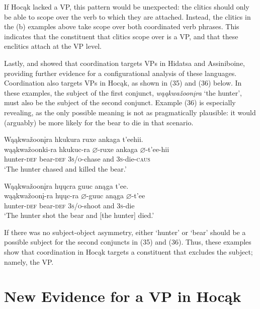 \documentclass[output=paper]{LSP/langsci}
\begin{document}
If Hoc\k{a}k lacked a VP, this pattern would be unexpected: the clitics should only be able to scope over the verb to which they are attached. Instead, the clitics in the (b) examples above take scope over both coordinated verb phrases. This indicates that the constituent that clitics scope over is a VP, and that these enclitics attach at the VP level. 
	
Lastly, \citet{Boyle2007} and \citet{West2003} showed that coordination targets VPs in Hidatsa and Assiniboine, providing further evidence for a configurational analysis of these languages.  Coordination also targets VPs in Hoc\k{a}k, as shown in (35) and (36) below. In these examples, the subject of the first conjunct, \textit{w\k{a}\k{a}kwa\v{z}oon\k{i}ra} `the hunter', must also be the subject of the second conjunct.  Example (36) is especially revealing, as the only possible meaning is not as pragmatically plausible: it would (arguably) be more likely for the bear to die in that scenario.

\begin{exe}
\ex 
\glll W\k{a}\k{a}kwa\v{z}oon\k{i}ra 		hk{u}k{u}ra 			ruxe 				ank{a}ga 	t'eehii. \\
w\k{a}\k{a}kwa\v{z}oonk{i}-ra 	hk{u}k{u}c-ra 		$\varnothing$-ruxe  		ank{a}ga 	$\varnothing$-t'ee-hii \\
hunter-\textsc{def} 					bear-\textsc{def} 	\textsc{3s/o}-chase and 		\textsc{3s}-die-\textsc{caus} \\
\trans`The hunter chased and killed the bear.'

\ex 
\glll W\k{a}\k{a}kwa\v{z}oon\k{i}ra 		h\k{u}\k{u}cra 		guuc 				an\k{a}ga 	t'ee. \\
w\k{a}\k{a}kwa\v{z}oon\k{i}-ra 	h\k{u}\k{u}c-ra 		$\varnothing$-guuc 			an\k{a}ga 	$\varnothing$-t'ee \\
hunter-\textsc{def} 		bear-\textsc{def} 	\textsc{3s/o}-shoot 		and 		\textsc{3s}-die \\
\trans `The hunter shot the bear and [the hunter] died.'
\end{exe}
	
If there was no subject-object asymmetry, either `hunter' or `bear' should be a possible subject for the second conjuncts in (35) and (36). Thus, these examples show that coordination in Hoc\k{a}k targets a constituent that excludes the subject; namely, the VP.

\section{New Evidence for a VP in Hoc\k{a}k}
\end{document}
